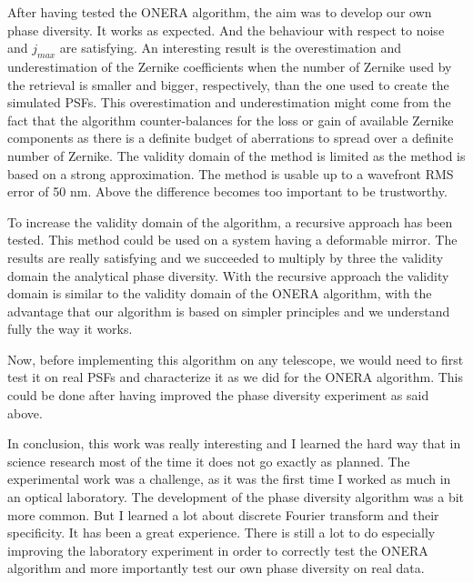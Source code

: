 \vspace{1cm}

After having tested the ONERA algorithm, the aim was to develop our own phase diversity. It works as expected. And the behaviour with respect to noise and $j_{max}$ are satisfying. An interesting result is the overestimation and underestimation of the Zernike coefficients when the number of Zernike used by the retrieval is smaller and bigger, respectively, than the one used to create the simulated PSFs. This overestimation and underestimation might come from the fact that the algorithm counter-balances for the loss or gain of available Zernike components as there is a definite budget of aberrations to spread over a definite number of Zernike. The validity domain of the method is limited as the method is based on a strong approximation. The method is usable up to a wavefront RMS error of 50 nm. Above the difference becomes too important to be trustworthy. 

To increase the validity domain of the algorithm, a recursive approach has been tested. This method could be used on a system having a deformable mirror. The results are really satisfying and we succeeded to multiply by three the validity domain the analytical phase diversity. With the recursive approach the validity domain is similar to the validity domain of the ONERA algorithm, with the advantage that our algorithm is based on simpler principles and we understand fully the way it works.

Now, before implementing this algorithm on any telescope, we would need to first test it on real PSFs and characterize it as we did for the ONERA algorithm. This could be done after having improved the phase diversity experiment as said above.

\vspace{1cm}

In conclusion, this work was really interesting and I learned the hard way that in science research most of the time it does not go exactly as planned. The experimental work was a challenge, as it was the first time I worked as much in an optical laboratory. The development of the phase diversity algorithm was a bit more common. But I learned a lot about discrete Fourier transform and their specificity. It has been a great experience. There is still a lot to do especially improving the laboratory experiment in order to correctly test the ONERA algorithm and more importantly test our own phase diversity on real data. 